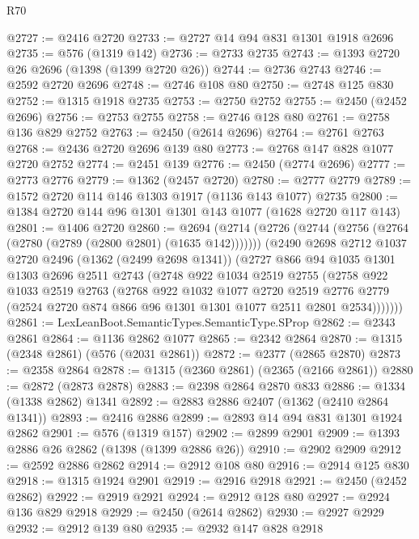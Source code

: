 \begin{lexlean}{R70}
\begin{coremodule}
@2727 := @2416 @2720
@2733 := @2727 @14 @94 @831 @1301 @1918 @2696
@2735 := @576 (@1319 @142)
@2736 := @2733 @2735
@2743 := @1393 @2720 @26 @2696 (@1398 (@1399 @2720 @26))
@2744 := @2736 @2743
@2746 := @2592 @2720 @2696
@2748 := @2746 @108 @80
@2750 := @2748 @125 @830
@2752 := @1315 @1918 @2735
@2753 := @2750 @2752
@2755 := @2450 (@2452 @2696)
@2756 := @2753 @2755
@2758 := @2746 @128 @80
@2761 := @2758 @136 @829 @2752
@2763 := @2450 (@2614 @2696)
@2764 := @2761 @2763
@2768 := @2436 @2720 @2696 @139 @80
@2773 := @2768 @147 @828 @1077 @2720 @2752
@2774 := @2451 @139
@2776 := @2450 (@2774 @2696)
@2777 := @2773 @2776
@2779 := @1362 (@2457 @2720)
@2780 := @2777 @2779
@2789 := @1572 @2720 @114 @146 @1303 @1917 (@1136 @143 @1077) @2735
@2800 := @1384 @2720 @144 @96 @1301 @1301 @143 @1077 (@1628 @2720 @117 @143)
@2801 := @1406 @2720
@2860 := @2694
    (@2714
      (@2726 (@2744 (@2756 (@2764 (@2780 (@2789 (@2800 @2801) (@1635 @142)))))))
      (@2490
        @2698
        @2712
        @1037
        @2720
        @2496
        (@1362 (@2499 @2698 @1341))
        (@2727
          @866
          @94
          @1035
          @1301
          @1303
          @2696
          @2511
          @2743
          (@2748
            @922
            @1034
            @2519
            @2755
            (@2758
              @922
              @1033
              @2519
              @2763
              (@2768
                @922
                @1032
                @1077
                @2720
                @2519
                @2776
                @2779
                (@2524 @2720 @874 @866 @96 @1301 @1301 @1077 @2511 @2801 @2534)))))))
@2861 := LexLeanBoot.SemanticTypes.SemanticType.SProp
@2862 := @2343 @2861
@2864 := @1136 @2862 @1077
@2865 := @2342 @2864
@2870 := @1315 (@2348 @2861) (@576 (@2031 @2861))
@2872 := @2377 (@2865 @2870)
@2873 := @2358 @2864
@2878 := @1315 (@2360 @2861) (@2365 (@2166 @2861))
@2880 := @2872 (@2873 @2878)
@2883 := @2398 @2864 @2870 @833
@2886 := @1334 (@1338 @2862) @1341
@2892 := @2883 @2886 @2407 (@1362 (@2410 @2864 @1341))
@2893 := @2416 @2886
@2899 := @2893 @14 @94 @831 @1301 @1924 @2862
@2901 := @576 (@1319 @157)
@2902 := @2899 @2901
@2909 := @1393 @2886 @26 @2862 (@1398 (@1399 @2886 @26))
@2910 := @2902 @2909
@2912 := @2592 @2886 @2862
@2914 := @2912 @108 @80
@2916 := @2914 @125 @830
@2918 := @1315 @1924 @2901
@2919 := @2916 @2918
@2921 := @2450 (@2452 @2862)
@2922 := @2919 @2921
@2924 := @2912 @128 @80
@2927 := @2924 @136 @829 @2918
@2929 := @2450 (@2614 @2862)
@2930 := @2927 @2929
@2932 := @2912 @139 @80
@2935 := @2932 @147 @828 @2918

\end{coremodule}
\end{lexlean}
